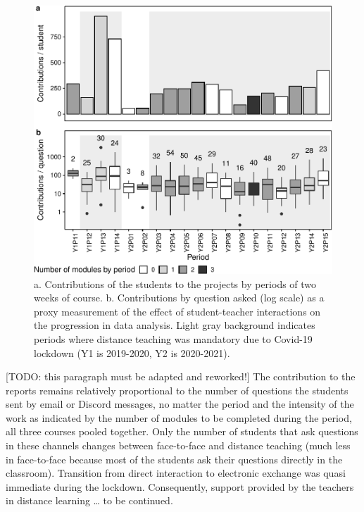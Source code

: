 \documentclass{aims}
\theoremstyle{definition}
\begin{document}
\begin{figure}
\includegraphics[width=1\linewidth]{teaching_data_science_files/figure-latex/fig_support_by_time-1} \caption{\label{fig:fig_support_by_time} a. Contributions of the students to the projects by periods of two weeks of course. b. Contributions by question asked (log scale) as a proxy measurement of the effect of student-teacher interactions on the progression in data analysis. Light gray background indicates periods where distance teaching was mandatory due to Covid-19 lockdown (Y1 is 2019-2020, Y2 is 2020-2021).}\label{fig:fig_support_by_time}
\end{figure}

{[}TODO: this paragraph must be adapted and reworked!{]} The
contribution to the reports remains relatively proportional to the
number of questions the students sent by email or Discord messages, no
matter the period and the intensity of the work as indicated by the
number of modules to be completed during the period, all three courses
pooled together. Only the number of students that ask questions in these
channels changes between face-to-face and distance teaching (much less
in face-to-face because most of the students ask their questions
directly in the classroom). Transition from direct interaction to
electronic exchange was quasi immediate during the lockdown.
Consequently, support provided by the teachers in distance learning
\ldots{} to be continued.
\end{document}
